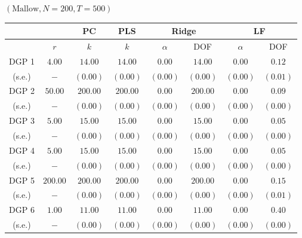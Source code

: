
    \begin{center} $(\mathrm{Mallow}, N=200, T=500)$ \
        \begin{tabular}{cccccccc}
            \hline \hline 
            & & PC & PLS & \multicolumn{2}{c}{Ridge} & \multicolumn{2}{c}{LF} \\
            \hline 
            & $r$ & $k$ & $k$ & $\alpha$ & DOF & $\alpha$ & DOF \\
            \hline 
            DGP 1 & $4.00$ & $14.00$ & $14.00$ & $0.00$ & $14.00$ & $0.00$ & $0.12$ \\
            (s.e.) & $-$ & $(0.00)$ & $(0.00)$ & $(0.00)$ & $(0.00)$ & $(0.00)$ & $(0.01)$ \\
            DGP 2 & $50.00$ & $200.00$ & $200.00$ & $0.00$ & $200.00$ & $0.00$ & $0.09$ \\
            (s.e.) & $-$ & $(0.00)$ & $(0.00)$ & $(0.00)$ & $(0.00)$ & $(0.00)$ & $(0.00)$ \\
            DGP 3 & $5.00$ & $15.00$ & $15.00$ & $0.00$ & $15.00$ & $0.00$ & $0.05$ \\
            (s.e.) & $-$ & $(0.00)$ & $(0.00)$ & $(0.00)$ & $(0.00)$ & $(0.00)$ & $(0.00)$ \\
            DGP 4 & $5.00$ & $15.00$ & $15.00$ & $0.00$ & $15.00$ & $0.00$ & $0.05$ \\
            (s.e.) & $-$ & $(0.00)$ & $(0.00)$ & $(0.00)$ & $(0.00)$ & $(0.00)$ & $(0.00)$ \\
            DGP 5 & $200.00$ & $200.00$ & $200.00$ & $0.00$ & $200.00$ & $0.00$ & $0.15$ \\
            (s.e.) & $-$ & $(0.00)$ & $(0.00)$ & $(0.00)$ & $(0.00)$ & $(0.00)$ & $(0.01)$ \\
            DGP 6 & $1.00$ & $11.00$ & $11.00$ & $0.00$ & $11.00$ & $0.00$ & $0.40$ \\
            (s.e.) & $-$ & $(0.00)$ & $(0.00)$ & $(0.00)$ & $(0.00)$ & $(0.00)$ & $(0.00)$ \\
            \hline
        \end{tabular}
    \end{center}
    